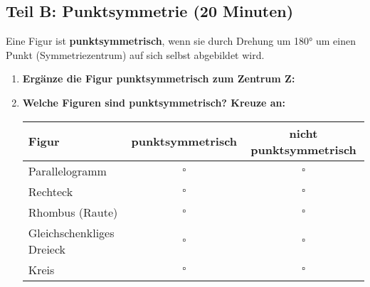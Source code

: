 \subsection*{Teil B: Punktsymmetrie (20 Minuten)}

\begin{merkbox}[Punktsymmetrie]
    Eine Figur ist \textbf{punktsymmetrisch}, wenn sie durch Drehung um 180° um einen Punkt (Symmetriezentrum) auf sich selbst abgebildet wird.
\end{merkbox}

\begin{enumerate}[label=\arabic*., resume]

    \item \textbf{Ergänze die Figur punktsymmetrisch zum Zentrum Z:}

    \vspace{0.5cm}

    \begin{center}
    \end{center}

    \vspace{1cm}

    \item \textbf{Welche Figuren sind punktsymmetrisch? Kreuze an:}

    \vspace{0.5cm}

    \begin{tabular}{|l|c|c|}
        \hline
        Figur & punktsymmetrisch & nicht punktsymmetrisch \\
        \hline
        Parallelogramm & $\square$ & $\square$ \\
        \hline
        Rechteck & $\square$ & $\square$ \\
        \hline
        Rhombus (Raute) & $\square$ & $\square$ \\
        \hline
        Gleichschenkliges Dreieck & $\square$ & $\square$ \\
        \hline
        Kreis & $\square$ & $\square$ \\
        \hline
    \end{tabular}


\end{enumerate}
